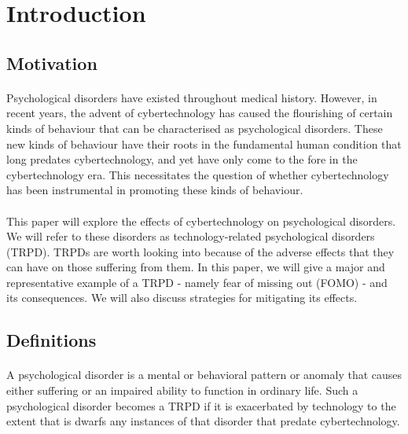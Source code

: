 \section{Introduction}
  \subsection{Motivation}
    \paragraph{}
      Psychological disorders have existed throughout medical history. However, in recent years, the advent of cybertechnology has caused the flourishing of certain kinds of behaviour that can be characterised as psychological disorders. These new kinds of behaviour have their roots in the fundamental human condition that long predates cybertechnology, and yet have only come to the fore in the cybertechnology era. This necessitates the question of whether cybertechnology has been instrumental in promoting these kinds of behaviour.
    \paragraph{}
      This paper will explore the effects of cybertechnology on psychological disorders. We will refer to these disorders as technology-related psychological disorders (TRPD). TRPDs are worth looking into because of the adverse effects that they can have on those suffering from them. In this paper, we will give a major and representative example of a TRPD - namely fear of missing out (FOMO) - and its consequences. We will also discuss strategies for mitigating its effects.
  \subsection{Definitions}
    \paragraph{}
      A psychological disorder is a mental or behavioral pattern or anomaly that causes either suffering or an impaired ability to function in ordinary life. Such a psychological disorder becomes a TRPD if it is exacerbated by technology to the extent that is dwarfs any instances of that disorder that predate cybertechnology.